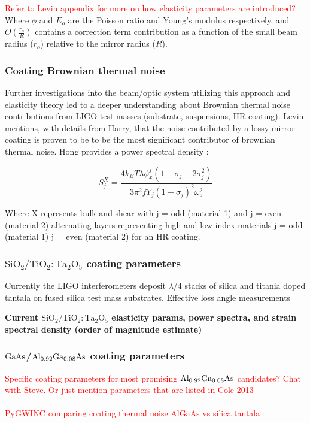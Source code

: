 \textcolor{red}{Refer to Levin appendix for more on how elasticity parameters are introduced?} Where $\phi$ and $E_o$ are the Poisson ratio and Young's modulus respectively, and $O(\frac{r_o}{R})$ contains a correction term contribution as a function of the small beam radius ($r_o$) relative to the mirror radius ($R$).

\subsubsection{Coating Brownian thermal noise}
Further investigations into the beam/optic system utilizing this approach and elasticity theory led to a deeper understanding about Brownian thermal noise contributions from LIGO test masses (substrate, suspensions, HR coating). Levin mentions, with details from Harry, that the noise contributed by a lossy mirror coating is proven to be to be the most significant contributor of brownian thermal noise. Hong provides a power spectral density \cite{Hong:2013}:

\begin{equation}
S_j^X = \frac{4k_B T \lambda \phi_x^j(1- \sigma_j - 2 \sigma_j^2)}{3 \pi^2 f Y_j (1-\sigma_j)^2 \omega_o^2}
\end{equation}

Where X represents bulk and shear with j = odd (material 1) and j = even (material 2) alternating layers representing high and low index materials j = odd (material 1) j = even (material 2) for an HR coating.

\subsubsection{$\mathrm{SiO_2}/\mathrm{TiO_2:Ta_2O_5}$ coating parameters}
Currently the LIGO interferometers deposit $\lambda$/4 stacks of silica and titania doped tantala on fused silica test mass substrates. Effective loss angle measurements \cite{Harry:06}

\textbf{Current $\mathrm{SiO_2}/\mathrm{TiO_2:Ta_2O_5}$ elasticity params, power spectra, and strain spectral density (order of magnitude estimate)}

\subsubsection{$\mathrm{GaAs}$/$\mathrm{Al_{0.92}Ga_{0.08}As}$ coating parameters}
\textcolor{red}{Specific coating parameters for most promising $\mathrm{Al_{0.92}Ga_{0.08}As}$ candidates? Chat with Steve. Or just mention parameters that are listed in Cole 2013}
\\
\\
\textcolor{red}{PyGWINC comparing coating thermal noise AlGaAs vs silica tantala}
\cite{Cole:2013}

